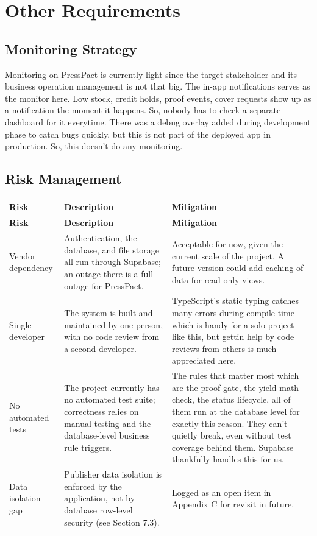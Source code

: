 \documentclass{scrreprt}
\begin{document}
\chapter{Other Requirements}

\section{Monitoring Strategy}
Monitoring on PressPact is currently light since the target stakeholder and its business operation management is not that big. The in-app notifications serves as the monitor here. Low stock, credit holds, proof events, cover requests show up
as a notification the moment it happens. So, nobody has to check a separate dashboard for it everytime. There was a debug overlay added during development phase to catch bugs quickly, but this is not part of the deployed app in production. So, this doesn't do any monitoring.

\section{Risk Management}
\begin{longtable}{R{0.20\textwidth} L{0.40\textwidth} L{0.40\textwidth}}
\toprule
{} \textbf{Risk} & \textbf{Description} & \textbf{Mitigation} \\
\midrule
\endfirsthead
\toprule
{} \textbf{Risk} & \textbf{Description} & \textbf{Mitigation} \\
\midrule
\endhead
Vendor dependency & Authentication, the database, and file storage all run through Supabase; an outage there is a full outage for PressPact. & Acceptable for now, given the current scale of the project. A future version could add caching of data for read-only views. \\
Single developer & The system is built and maintained by one person, with no code review from a second developer. & TypeScript's static typing catches many errors during compile-time which is handy for a solo project like this, but gettin help by code reviews from others is much appreciated here. \\
No automated tests & The project currently has no automated test suite; correctness relies on manual testing and the database-level business rule triggers. & The rules that matter most which are the proof gate, the yield math check, the status lifecycle, all of them run at the database level for exactly this reason. They can't quietly break, even without test coverage behind them. Supabase thankfully handles this for us. \\
Data isolation gap & Publisher data isolation is enforced by the application, not by database row-level security (see Section 7.3). & Logged as an open item in Appendix C for revisit in future. \\
\bottomrule
\end{longtable}
\end{document}
